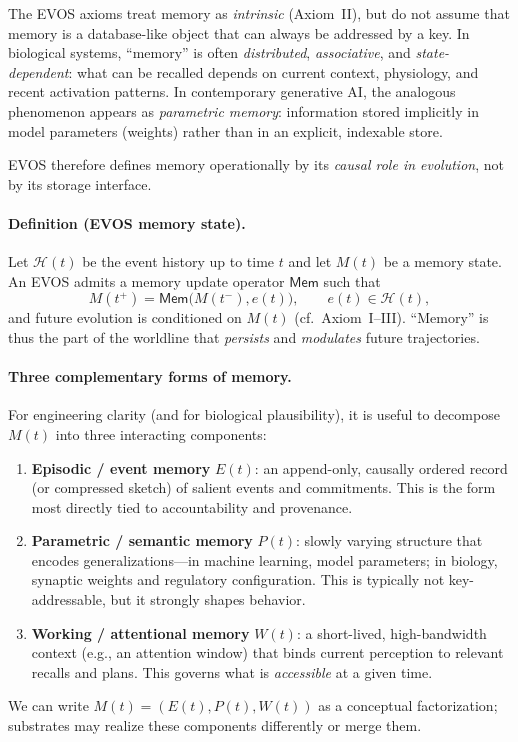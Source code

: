 \documentclass[11pt]{article}
\begin{document}
The EVOS axioms treat memory as \emph{intrinsic} (Axiom~II), but do not assume that memory
is a database-like object that can always be addressed by a key. In biological systems,
``memory'' is often \emph{distributed}, \emph{associative}, and \emph{state-dependent}:
what can be recalled depends on current context, physiology, and recent activation
patterns. In contemporary generative AI, the analogous phenomenon appears as
\emph{parametric memory}: information stored implicitly in model parameters (weights)
rather than in an explicit, indexable store.

EVOS therefore defines memory operationally by its \emph{causal role in evolution}, not by
its storage interface.

\paragraph{Definition (EVOS memory state).}
Let $\mathcal{H}(t)$ be the event history up to time $t$ and let $M(t)$ be a memory state.
An EVOS admits a memory update operator $\mathsf{Mem}$ such that
\[
M(t^+) = \mathsf{Mem}\!\big(M(t^-), e(t)\big), \qquad e(t)\in \mathcal{H}(t),
\]
and future evolution is conditioned on $M(t)$ (cf.\ Axiom~I--III). ``Memory'' is thus the
part of the worldline that \emph{persists} and \emph{modulates} future trajectories.

\paragraph{Three complementary forms of memory.}
For engineering clarity (and for biological plausibility), it is useful to decompose
$M(t)$ into three interacting components:
\begin{enumerate}
  \item \textbf{Episodic / event memory} $E(t)$: an append-only, causally ordered record (or
        compressed sketch) of salient events and commitments. This is the form most
        directly tied to accountability and provenance.
  \item \textbf{Parametric / semantic memory} $P(t)$: slowly varying structure that encodes
        generalizations---in machine learning, model parameters; in biology, synaptic
        weights and regulatory configuration. This is typically not key-addressable, but
        it strongly shapes behavior.
  \item \textbf{Working / attentional memory} $W(t)$: a short-lived, high-bandwidth context
        (e.g., an attention window) that binds current perception to relevant recalls and
        plans. This governs what is \emph{accessible} at a given time.
\end{enumerate}
We can write $M(t) = (E(t), P(t), W(t))$ as a conceptual factorization; substrates may
realize these components differently or merge them.
\end{document}
